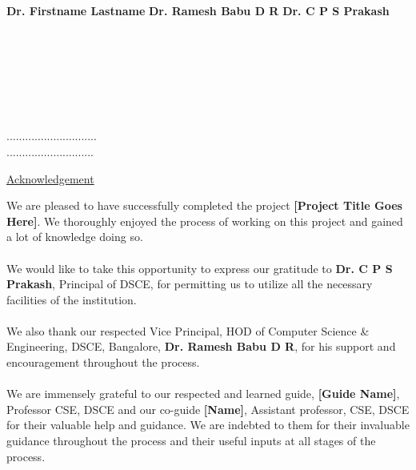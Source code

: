 \documentclass[ 12pt,a4paper,twocolumn,fleqn]{article}
\begin{document}
\\
\textbf{Dr. Firstname Lastname}
\hfill
\textbf{Dr. Ramesh Babu D R}
\hfill
\textbf{Dr. C P S Prakash} \\
\hfill
{}
\hfill
{} \\
\hfill
{}
\hfill
{} \\
\\
\hfill
{}
\hfill
{} \\
\\
\\
\hfill
{} \\
\hfill{.............................} \\
\hfill{............................} \\
\newpage
  \pagestyle{fancy}
\thisfancypage{%
  \setlength{\fboxsep}{20pt}\doublebox}{}
\begin{center}
\LARGE{{\underline{Acknowledgement}}} \\
\end{center}
\normalsize
We are pleased to have successfully completed the project \textbf{[Project Title Goes Here]}. We thoroughly enjoyed the process of working on this project and gained a lot of knowledge doing so.
\\
\hfill
\\
We would like to take this opportunity to express our gratitude to \textbf{Dr. C P S Prakash}, Principal of DSCE, for permitting us to utilize all the necessary facilities of the institution.
\\
\hfill
\\
We also thank our respected Vice Principal, HOD of Computer Science \& Engineering, DSCE, Bangalore,\textbf{ Dr. Ramesh Babu D R}, for his support and encouragement throughout the process.
\\
\hfill
\\
We are immensely grateful to our respected and learned guide, \textbf{[Guide Name]}, Professor CSE, DSCE and our co-guide \textbf{[Name]}, Assistant professor, CSE, DSCE for their valuable help and guidance. We are indebted to them for their invaluable guidance throughout the process and their useful inputs at all stages of the process.
\\
\hfill
\\
\end{document}

